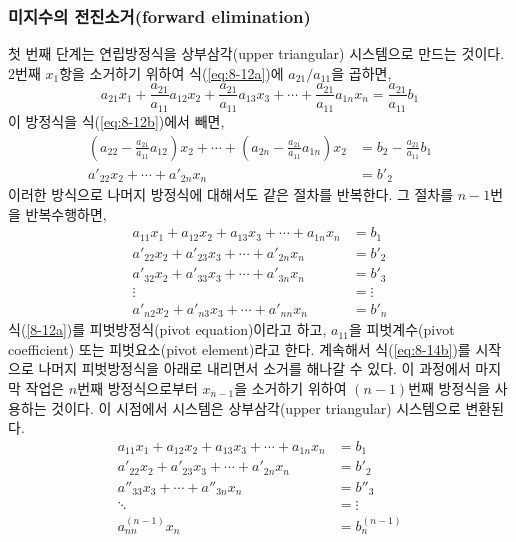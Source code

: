 \subsubsection{미지수의 전진소거(forward elimination)}
첫 번째 단계는 연립방정식을 상부삼각(upper triangular) 시스템으로 만드는 것이다. 2번째 $x_{1}$항을 소거하기 위하여 식(\ref{eq:8-12a})에 $a_{21}/a_{11}$을 곱하면,
\clearpage
\begin{equation}\label{eq:8-13}
a_{21}x_{1}+\frac{a_{21}}{a_{11}}a_{12}x_{2}+\frac{a_{21}}{a_{11}}a_{13}x_{3}+\cdots+\frac{a_{21}}{a_{11}}a_{1n}x_{n}=\frac{a_{21}}{a_{11}}b_{1}
\end{equation}
이 방정식을 식(\ref{eq:8-12b})에서 빼면,
\begin{align}
\left(a_{22}-\frac{a_{21}}{a_{11}}a_{12}\right)x_{2}+\cdots+\left(a_{2n}-\frac{a_{21}}{a_{11}}a_{1n}\right)x_{2}&=b_{2}-\frac{a_{21}}{a_{11}}b_{1}\\
a'_{22}x_{2}+\cdots+a'_{2n}x_{n}&=b'_{2}
\end{align}
이러한 방식으로 나머지 방정식에 대해서도 같은 절차를 반복한다. 그 절차를 $n-1$번을 반복수행하면,
\begin{align}
a_{11}x_{1}+a_{12}x_{2}+a_{13}x_{3}+\cdots+a_{1n}x_{n}&=b_{1}\label{eq:8-14a}\\
a'_{22}x_{2}+a'_{23}x_{3}+\cdots+a'_{2n}x_{n}&=b'_{2}\label{eq:8-14b}\\
a'_{32}x_{2}+a'_{33}x_{3}+\cdots+a'_{3n}x_{n}&=b'_{3}\label{eq:8-14c}\\ 
\vdots\qquad{}&=\vdots\nonumber\\
a'_{n2}x_{2}+a'_{n3}x_{3}+\cdots+a'_{nn}x_{n}&=b'_{n}\label{eq:8-14d}
\end{align}
식(\ref{8-12a})를 피벗방정식(pivot equation)이라고 하고, $a_{11}$을 피벗계수(pivot coefficient) 또는 피벗요소(pivot element)라고 한다. 계속해서 식(\ref{eq:8-14b})를 시작으로 나머지 피벗방정식을 아래로 내리면서 소거를 해나갈 수 있다. 이 과정에서 마지막 작업은 $n$번째 방정식으로부터 $x_{n-1}$을 소거하기 위하여 $(n-1)$번째 방정식을 사용하는 것이다. 이 시점에서 시스템은 상부삼각(upper triangular) 시스템으로 변환된다.
\begin{align}
a_{11}x_{1}+a_{12}x_{2}+a_{13}x_{3}+\cdots+a_{1n}x_{n}&=b_{1}\label{eq:8-15a}\\
a'_{22}x_{2}+a'_{23}x_{3}+\cdots+a'_{2n}x_{n}&=b'_{2}\label{eq:8-15b}\\
a''_{33}x_{3}+\cdots+a''_{3n}x_{n}&=b''_{3}\label{eq:8-15c}\\
\ddots\qquad{}&=\vdots\nonumber\\
a_{nn}^{(n-1)}x_{n}&=b_{n}^{(n-1)\label{eq:8-15d}}
\end{align}
